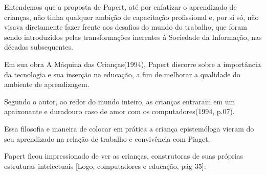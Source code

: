 \documentclass[
12pt,		%
openright,	%
twoside,  %
a4paper,			%
chapter=TITLE,		%
english,			%
french,				%
spanish,			%
brazil				%
]{USPSC-classe/USPSC}
\begin{document}
Entendemos que a proposta de Papert, at\'e por enfatizar o aprendizado de crian\c{c}as, n\~ao tinha qualquer ambi\c{c}\~ao de capacita\c{c}\~ao profissional e, por si s\'o, n\~ao visava diretamente fazer frente aos desafios do \textquotedbl mundo do trabalho\textquotedbl , que foram sendo introduzidos pelas transforma\c{c}\~oes inerentes \`a Sociedade da Informa\c{c}\~ao, nas d\'ecadas subsequentes.










Em sua obra \textquotedbl A M\'aquina das Crian\c{c}as\textquotedbl  (1994), Papert discorre sobre a import\^ancia da tecnologia e sua inser\c{c}\~ao na educa\c{c}\~ao, a fim de melhorar a qualidade do ambiente de aprendizagem.











\noindent\begin{center}\mbox{\centering{}}\end{center}


Segundo o autor, \textquotedbl ao redor do mundo inteiro, as crian\c{c}as entraram em um apaixonante e duradouro caso de amor com os computadores\textquotedbl  (1994, p.07).










Essa filosofia e maneira de colocar em pr\'atica a crian\c{c}a epistem\'ologa vieram do seu aprendizado na rela\c{c}\~ao de trabalho e conviv\^encia com Piaget.










Papert ficou impressionado de ver as crian\c{c}as, construtoras de suas pr\'oprias estruturas intelectuais [Logo, computadores e educa\c{c}\~ao, p\'ag 35]:
\end{document}
